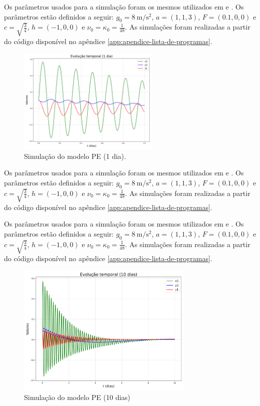 Os parâmetros usados para a simulação foram os mesmos utilizados em \citet{Lorenz1980} e \cite{Chekroun2021}. Os parâmetros estão definidos a seguir: $g_0 = \SI{8}{\meter\per\square\second}$, $a = (1, 1, 3)$, $F = (0.1, 0, 0)$ e $c = \sqrt{\tfrac{3}{4}}$, $h=(-1, 0, 0)$ e $\nu_0 = \kappa_0 = \frac{1}{48}$. As simulações foram realizadas a partir do código disponível no apêndice \ref{app:apendice-lista-de-programas}.  

\begin{figure}[H]
  \centering
  \includegraphics[width=0.6\textwidth]{00_TCC/01_LATEX/figuras/ch01_lorenz_80/evolucao_temporal_01.png}
  \caption{Simulação do modelo PE (1 dia).\label{fig:lorenz80_pe_1}}
\end{figure}

Os parâmetros usados para a simulação foram os mesmos utilizados em \citet{Lorenz1980} e \cite{Chekroun2021}. Os parâmetros estão definidos a seguir: $g_0 = \SI{8}{\meter\per\square\second}$, $a = (1, 1, 3)$, $F = (0.1, 0, 0)$ e $c = \sqrt{\tfrac{3}{4}}$, $h=(-1, 0, 0)$ e $\nu_0 = \kappa_0 = \frac{1}{48}$. As simulações foram realizadas a partir do código disponível no apêndice \ref{app:apendice-lista-de-programas}.  

Os parâmetros usados para a simulação foram os mesmos utilizados em \citet{Lorenz1980} e \cite{Chekroun2021}. Os parâmetros estão definidos a seguir: $g_0 = \SI{8}{\meter\per\square\second}$, $a = (1, 1, 3)$, $F = (0.1, 0, 0)$ e $c = \sqrt{\tfrac{3}{4}}$, $h=(-1, 0, 0)$ e $\nu_0 = \kappa_0 = \frac{1}{48}$. As simulações foram realizadas a partir do código disponível no apêndice \ref{app:apendice-lista-de-programas}.  


\begin{figure}[H]
  \centering
    \includegraphics[width=0.75\textwidth]{00_TCC/01_LATEX/figuras/ch01_lorenz_80/evolucao_temporal_10.png}
  \caption{Simulação do modelo PE (10 dias)\label{fig:lorenz80_pe_2}}
\end{figure}

